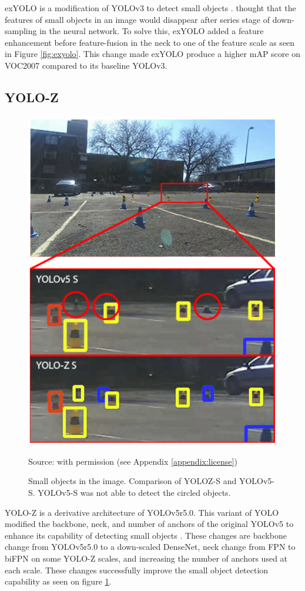   exYOLO is a modification of YOLOv3 to detect small objects \parencite{exyolo}.
  \textcite{exyolo} thought that the features of small objects in an image would disappear
  after series stage of down-sampling in the neural network.
  To solve this, exYOLO added a feature enhancement before feature-fusion in the neck to one of the feature scale as seen in Figure \ref{fig:exyolo}.
  This change made exYOLO produce a higher mAP score on VOC2007 compared to its baseline YOLOv3.

  \subsection{YOLO-Z}
  \begin{figure}
    \centering
    \includegraphics[width=.7\textwidth]{figures/yoloz-result.png}
    \caption*{Source: \textcite{yoloz} with permission (see Appendix \ref{appendix:license})}
    \vspace{-1ex}
    \caption{Small objects in the image. Comparison of YOLOZ-S and YOLOv5-S. YOLOv5-S was not able to detect the circled objects.}
    \label{fig:yolozcone}
  \end{figure}
  YOLO-Z is a derivative architecture of YOLOv5r5.0.
  This variant of YOLO modified the backbone, neck, and number of anchors of the original YOLOv5 to 
  enhance its capability of detecting small objects \parencite{yoloz}.
  These changes are backbone change from YOLOv5r5.0 to a down-scaled DenseNet,
  neck change from FPN to biFPN on some YOLO-Z scales, and increasing the number of anchors used at each scale.
  These changes successfully improve the small object detection capability as seen on figure \ref{fig:yolozcone}.

